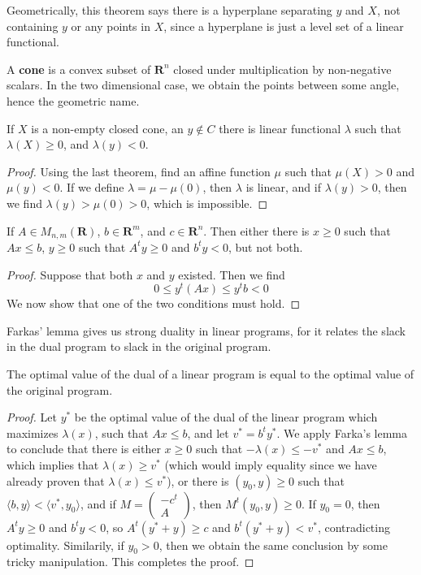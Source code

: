 Geometrically, this theorem says there is a hyperplane separating $y$ and $X$, not containing $y$ or any points in $X$, since a hyperplane is just a level set of a linear functional.

A {\bf cone} is a convex subset of $\mathbf{R}^n$ closed under multiplication by non-negative scalars. In the two dimensional case, we obtain the points between some angle, hence the geometric name.

\begin{theorem}
    If $X$ is a non-empty closed cone, an $y \not \in C$ there is linear functional $\lambda$ such that $\lambda(X) \geq 0$, and $\lambda(y) < 0$.
\end{theorem}
\begin{proof}
    Using the last theorem, find an affine function $\mu$ such that $\mu(X) > 0$ and $\mu(y) < 0$. If we define $\lambda = \mu - \mu(0)$, then $\lambda$ is linear, and if $\lambda(y) > 0$, then we find $\lambda(y) > \mu(0) > 0$, which is impossible.
\end{proof}

\begin{theorem}[Farkas]
        If $A \in M_{n,m}(\mathbf{R})$, $b \in \mathbf{R}^m$, and $c \in \mathbf{R}^n$. Then either there is $x \geq 0$ such that $Ax \leq b$, $y \geq 0$ such that $A^t y \geq 0$ and $b^t y < 0$, but not both.
\end{theorem}
\begin{proof}
    Suppose that both $x$ and $y$ existed. Then we find
    \[ 0 \leq y^t (Ax) \leq y^t b < 0 \]
    We now show that one of the two conditions must hold.
\end{proof}

Farkas' lemma gives us strong duality in linear programs, for it relates the slack in the dual program to slack in the original program.

\begin{theorem}
    The optimal value of the dual of a linear program is equal to the optimal value of the original program.
\end{theorem}
\begin{proof}
    Let $y^*$ be the optimal value of the dual of the linear program which maximizes $\lambda(x)$, such that $Ax \leq b$, and let $v^* = b^t y^*$. We apply Farka's lemma to conclude that there is either $x \geq 0$ such that $- \lambda(x) \leq -v^*$ and $Ax \leq b$, which implies that $\lambda(x) \geq v^*$ (which would imply equality since we have already proven that $\lambda(x) \leq v^*$), or there is $(y_0, y) \geq 0$ such that $\langle b, y \rangle < \langle v^*, y_0 \rangle$, and if $M = \begin{pmatrix} -c^t \\ A \end{pmatrix}$, then $M^t (y_0, y) \geq 0$. If $y_0 = 0$, then $A^t y \geq 0$ and $b^t y < 0$, so $A^t(y^* + y) \geq c$ and $b^t(y^* + y) < v^*$, contradicting optimality. Similarily, if $y_0 > 0$, then we obtain the same conclusion by some tricky manipulation. This completes the proof.
\end{proof}

